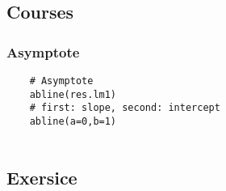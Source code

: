 \subsection{Courses}
\lstset{language=R}

\subsubsection{Asymptote}
\begin{lstlisting}
    # Asymptote
    abline(res.lm1)
    # first: slope, second: intercept
    abline(a=0,b=1)
    
\end{lstlisting}

\subsection{Exersice}

